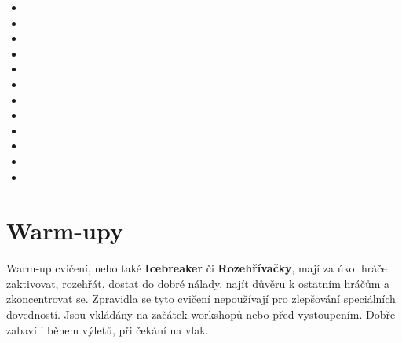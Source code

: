 \documentclass[main.tex]{subfiles}
\begin{document}
\begin{multicols}{2}\begin{itemize} 
\item  {}  
\item  {}  
\item  {}  
\item  {}  
\item  {}  
\item  {}  
\item  {}  
\item  {}  
\item  {}  
\item  {}  
\item  {}  
\item  {}  
\end{itemize} 
\end{multicols} 
\needspace{5cm} \section{Warm-upy} \label{warm-upy} Warm-up cvičení, nebo také \textbf{Icebreaker}{} či \textbf{Rozehřívačky}{}, mají za úkol hráče zaktivovat, rozehřát, dostat do dobré nálady, najít důvěru k ostatním hráčům a zkoncentrovat se. Zpravidla se tyto cvičení nepoužívají pro zlepšování speciálních dovedností. Jsou vkládány na začátek workshopů nebo před vystoupením. Dobře zabaví i během výletů, při čekání na vlak. 
 
\end{document}
